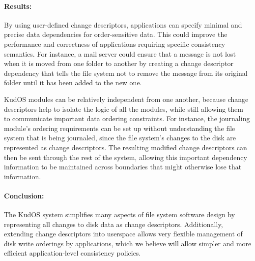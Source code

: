 \documentclass[12pt]{article}
\newcommand{\preparagraphspacing}{}%
\begin{document}
\preparagraphspacing
\paragraph{Results:}

By using user-defined change descriptors, applications can specify minimal and
precise data dependencies for order-sensitive data. This could improve the
performance and correctness of applications requiring specific consistency
semantics. For instance, a mail server could ensure that a message is not lost
when it is moved from one folder to another by creating a change descriptor
dependency that tells the file system not to remove the message from its
original folder until it has been added to the new one.


KudOS modules can be relatively independent from one another, because change
descriptors help to isolate the logic of all the modules, while still allowing
them to communicate important data ordering constraints. For instance, the
journaling module's ordering requirements can be set up without understanding
the file system that is being journaled, since the file system's changes to the
disk are represented as change descriptors. The resulting modified change
descriptors can then be sent through the rest of the system, allowing
this important dependency information to be maintained across boundaries
that might otherwise lose that information.

\preparagraphspacing
\paragraph{Conclusion:}

The KudOS system simplifies many aspects of file system software design by
representing all changes to disk data as change descriptors. Additionally,
extending change descriptors into userspace allows very flexible management of
disk write orderings by applications, which we believe will allow simpler
and more efficient application-level consistency policies.
\end{document}
